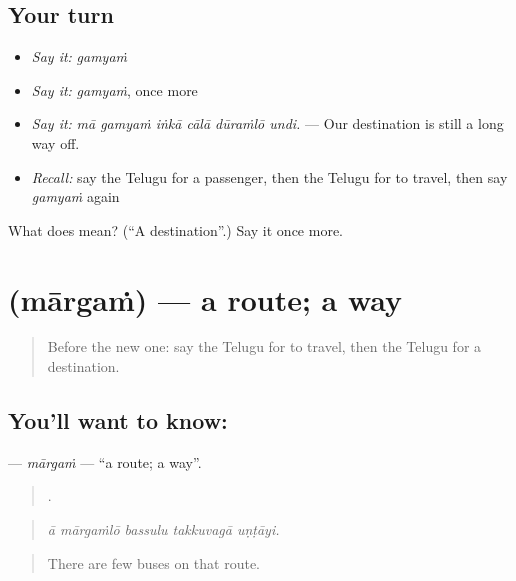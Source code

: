 \subsection*{Your turn}
\begin{itemize}
\raggedright
  \item \emph{Say it:} \emph{gamyaṁ}
  \item \emph{Say it:} \emph{gamyaṁ}, once more
  \item \emph{Say it:} \emph{mā gamyaṁ iṅkā cālā dūraṁlō undi.} — Our destination is still a long way off.
  \item \emph{Recall:} say the Telugu for a passenger, then the Telugu for to travel, then say \emph{gamyaṁ} again
\end{itemize}

\begin{tcolorbox}[breakable,colback=teal!4,colframe=teal!35!black,title={Before you move on}]
What does  mean? (\textquotedblleft{}A destination\textquotedblright{}.) Say it once more.
\end{tcolorbox}
\section[\texorpdfstring{\te{మార్గం} (mārgaṁ)}{మార్గం (mārgaṁ)}]{ (mārgaṁ) — a route; a way}

\label{lesson:TE-C438-margam}



\begin{quote}
Before the new one: say the Telugu for to travel, then the Telugu for a destination.
\end{quote}

\subsection*{You'll want to know: }
\textbf{} — \emph{mārgaṁ} — \textquotedblleft{}a route; a way\textquotedblright{}.

\begin{quote}
    .
\end{quote}

\begin{quote}
\emph{ā mārgaṁlō bassulu takkuvagā uṇṭāyi.}
\end{quote}

\begin{quote}
There are few buses on that route.
\end{quote}

